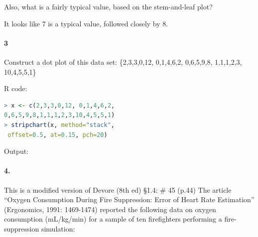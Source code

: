     Also, what is a fairly typical value, based on the stem-and-leaf plot?

    \begin{mdframed}
        It looks like 7 is a typical value, followed closely by 8.
    \end{mdframed}

    \paragraph*{3}
    Construct a dot plot of this data set: \{2,3,3,0,12, 0,1,4,6,2, 0,6,5,9,8, 1,1,1,2,3, 10,4,5,5,1\}

    \begin{mdframed}
        \begin{multicols}{2}
            R code:
        \begin{lstlisting}[language=R]
> x <- c(2,3,3,0,12, 0,1,4,6,2, 
0,6,5,9,8,1,1,1,2,3,10,4,5,5,1)
> stripchart(x, method="stack",
 offset=0.5, at=0.15, pch=20)
        \end{lstlisting}
        \columnbreak
        Output:
        \centering{}
    \end{multicols}
    \end{mdframed}

    \paragraph*{4.}
    This is a modified version of Devore (8th ed) \S1.4: \# 45 (p.44) The article “Oxygen Consumption During Fire Suppression: Error of Heart Rate Estimation” (Ergonomics, 1991: 1469-1474) reported the following data on oxygen consumption (mL/kg/min) for a sample of ten firefighters performing a fire-suppression simulation:

